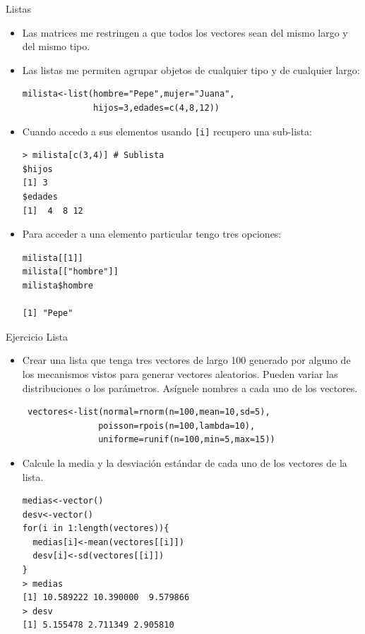 \documentclass[handout]{beamer}
\begin{document}
\begin{frame}[fragile]{Listas}
\scriptsize{
\begin{itemize}
 \item Las matrices me restringen a que todos los vectores sean del mismo largo y del mismo tipo.
 \item Las listas me permiten agrupar objetos de cualquier tipo y de cualquier largo:
 \begin{verbatim}
milista<-list(hombre="Pepe",mujer="Juana",
              hijos=3,edades=c(4,8,12))
 \end{verbatim}
 \item Cuando accedo a sus elementos usando \verb+[i]+ recupero una sub-lista:
 \begin{verbatim}
> milista[c(3,4)] # Sublista
$hijos
[1] 3
$edades
[1]  4  8 12
 \end{verbatim}
\item Para acceder a una elemento particular tengo tres opciones:
\begin{verbatim}
milista[[1]]
milista[["hombre"]]
milista$hombre

[1] "Pepe"
\end{verbatim}


\end{itemize}



}
\end{frame}

\begin{frame}[fragile]{Ejercicio Lista}
\scriptsize{

\begin{itemize}
 \item Crear una lista que tenga tres vectores de largo 100  generado por alguno de los mecanismos vistos para generar vectores aleatorios. Pueden variar las distribuciones o los parámetros. Asígnele nombres a cada uno de los vectores. \pause
 \begin{verbatim}
 vectores<-list(normal=rnorm(n=100,mean=10,sd=5),
               poisson=rpois(n=100,lambda=10),
               uniforme=runif(n=100,min=5,max=15))
 \end{verbatim}

\item Calcule la media y la desviación estándar de cada uno de los vectores de la lista. \pause
\begin{verbatim}
medias<-vector()
desv<-vector()
for(i in 1:length(vectores)){
  medias[i]<-mean(vectores[[i]])
  desv[i]<-sd(vectores[[i]])
}
> medias
[1] 10.589222 10.390000  9.579866
> desv
[1] 5.155478 2.711349 2.905810
\end{verbatim}

 
\end{itemize}

}
\end{frame}
\end{document}
